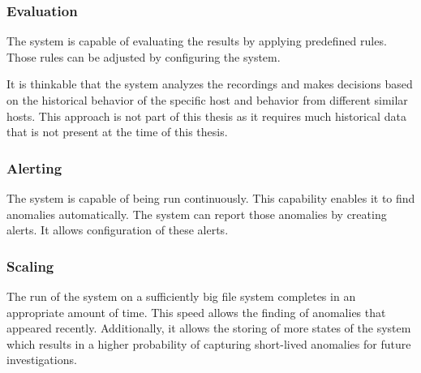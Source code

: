 \documentclass[
	a4paper,					%
	10pt,							%
	twoside,					%
	openright,				%
	notitlepage,			%
	parskip=half,			%
]{scrreprt}					%
\begin{document}
\subsubsection{Evaluation}
The system is capable of evaluating the results by applying predefined rules. Those rules can be adjusted by configuring the system.

It is thinkable that the system analyzes the recordings and makes decisions based on the historical behavior of the specific host and behavior from different similar hosts. This approach is not part of this thesis as it requires much historical data that is not present at the time of this thesis. 

\subsubsection{Alerting}
The system is capable of being run continuously. This capability enables it to find anomalies automatically. The system can report those anomalies by creating alerts. It allows configuration of these alerts.

\subsubsection{Scaling}
The run of the system on a sufficiently big file system completes in an appropriate amount of time. This speed allows the finding of anomalies that appeared recently. Additionally, it allows the storing of more states of the system which results in a higher probability of capturing short-lived anomalies for future investigations. 




\newpage
\clearpage

\printglossaries

\clearpage

\end{document}
